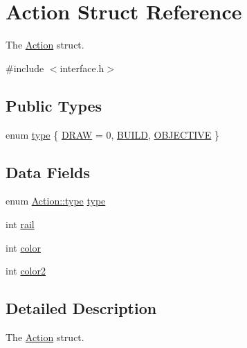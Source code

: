 \hypertarget{structAction}{\section{Action Struct Reference}
\label{structAction}
}


The \hyperlink{structAction}{Action} struct.  




{\ttfamily \#include $<$interface.\-h$>$}

\subsection*{Public Types}
\begin{DoxyCompactItemize}
\item 
enum \hyperlink{structAction_a7aead736a07eaf25623ad7bfa1f0ee2d}{type} \{ \hyperlink{structAction_a7aead736a07eaf25623ad7bfa1f0ee2da61f3c57b6943c85413975507aede78cd}{D\-R\-A\-W} = 0, 
\hyperlink{structAction_a7aead736a07eaf25623ad7bfa1f0ee2da36ea76657e6cba209d9d0a7148deef05}{B\-U\-I\-L\-D}, 
\hyperlink{structAction_a7aead736a07eaf25623ad7bfa1f0ee2da848633dc0433ee0c578691f4d36b9a77}{O\-B\-J\-E\-C\-T\-I\-V\-E}
 \}
\end{DoxyCompactItemize}
\subsection*{Data Fields}
\begin{DoxyCompactItemize}
\item 
enum \hyperlink{structAction_a7aead736a07eaf25623ad7bfa1f0ee2d}{Action\-::type} \hyperlink{structAction_ac4770bb96de67bcd126a908b894aed3e}{type}
\item 
int \hyperlink{structAction_a1017757e6fb62c1e1415b8663a5fc128}{rail}
\item 
int \hyperlink{structAction_a0fd02fb9277ffcb35a75066ffe95e8c7}{color}
\item 
int \hyperlink{structAction_af2bf5a425a34388039e1cdfd13630ac5}{color2}
\end{DoxyCompactItemize}


\subsection{Detailed Description}
The \hyperlink{structAction}{Action} struct. 

